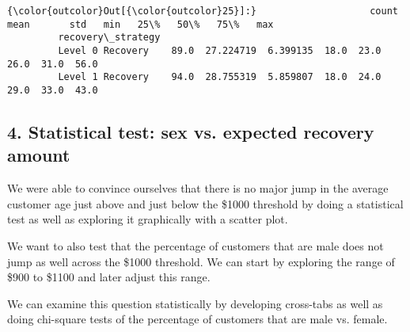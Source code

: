 \documentclass[11pt]{article}
\begin{document}
\begin{Verbatim}[commandchars=\\\{\}]
{\color{outcolor}Out[{\color{outcolor}25}]:}                    count       mean       std   min   25\%   50\%   75\%   max
         recovery\_strategy                                                          
         Level 0 Recovery    89.0  27.224719  6.399135  18.0  23.0  26.0  31.0  56.0
         Level 1 Recovery    94.0  28.755319  5.859807  18.0  24.0  29.0  33.0  43.0
\end{Verbatim}
            
    \subsection{4. Statistical test: sex vs. expected recovery
amount}\label{statistical-test-sex-vs.-expected-recovery-amount}

We were able to convince ourselves that there is no major jump in the
average customer age just above and just below the \$1000 threshold by
doing a statistical test as well as exploring it graphically with a
scatter plot.

We want to also test that the percentage of customers that are male does
not jump as well across the \$1000 threshold. We can start by exploring
the range of \$900 to \$1100 and later adjust this range.

We can examine this question statistically by developing cross-tabs as
well as doing chi-square tests of the percentage of customers that are
male vs. female.
\end{document}
